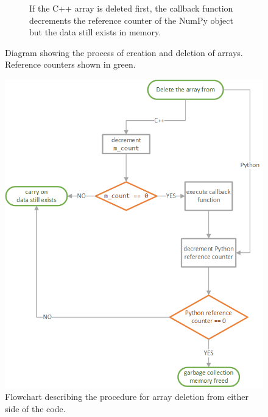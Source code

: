\begin{figure}[h!]
\begin{subfigure}{0.9\textwidth}
        \caption{If the C++ array is deleted first, the callback function decrements 
        the reference counter of the NumPy object but the data still exists in memory.}
        \label{fig:array_creation_deletion_d}
    \end{subfigure}
    \caption{Diagram showing the process of creation and deletion of arrays. Reference 
    counters shown in green.}
    \label{fig:array_creation_deletion}
\end{figure}

\clearpage

\begin{figure}[h!]
    \centering
    \includegraphics{img/deletion_flowchart}
    \caption{Flowchart describing the procedure for array deletion from either side of 
    the code.}
    \label{fig:array_deletion}
\end{figure}

\clearpage

